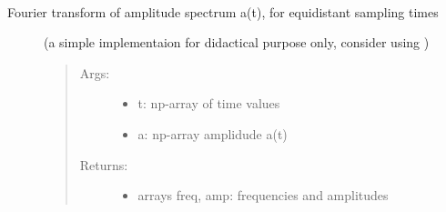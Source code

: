 \documentclass[letterpaper,10pt,english]{sphinxmanual}
\begin{document}
\begin{fulllineitems}
\label{\detokenize{index:PhyPraKit.PhyPraKit.FourierSpectrum}}~\begin{description}
\item[{Fourier transform of amplitude spectrum a(t), for equidistant sampling times}] \leavevmode
(a simple implementaion for didactical purpose only, 
consider using  )
\begin{quote}
\begin{description}
\item[{Args:}] \leavevmode\begin{itemize}
\item {} 
t: np-array of time values

\item {} 
a: np-array amplidude a(t)

\end{itemize}

\item[{Returns:}] \leavevmode\begin{itemize}
\item {} 
arrays freq, amp: frequencies and amplitudes

\end{itemize}

\end{description}
\end{quote}

\end{description}

\end{fulllineitems}

\end{document}
